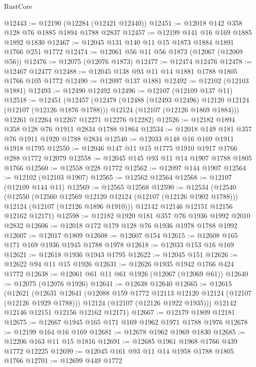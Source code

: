 \begin{lexlean}{RustCore}
\begin{coremodule}
@12443 := @12190 (@12284 (@12421 @12440))
@12451 := @12018 @142 @358 @128 @76 @1885 @1894 @1788 @2837
@12457 := @12199 @141 @16 @169 @1885 @1892 @1830
@12467 := @12045 @131 @140 @11 @15 @1873 @1884 @1891 @1766 @251 @1772
@12474 := @12061 @56 @11 @56 @1873 (@12067 (@12069 @56))
@12476 := @12075 (@12076 @1873)
@12477 := @12474 @12476
@12478 := @12467 @12477
@12488 := @12045 @138 @93 @11 @14 @1881 @1788 @1805 @1766 @105 @1772
@12490 := @12097 @137 @1881
@12492 := @12102 (@12103 @1881)
@12493 := @12490 @12492
@12496 := @12107 (@12109 @137 @11)
@12518 := @12451
    (@12457
      (@12478
        (@12488 (@12493 @12496) @12120 @12124 (@12107 (@12126 @1876 @1788)))
        @12124
        (@12107 (@12126 @1869 @1884)))
      @12261
      @12264
      @12267
      @12271
      @12276
      @12282)
@12526 := @12182 @1894 @358 @128 @76 @1911 @2834 @1788 @1864
@12534 := @12018 @149 @181 @357 @76 @1911 @1920 @1788 @2834
@12540 := @12033 @148 @16 @169 @1911 @1918 @1795
@12550 := @12046 @147 @11 @15 @1775 @1910 @1917 @1766 @288 @1772 @12079
@12558 := @12045 @145 @93 @11 @14 @1907 @1788 @1805 @1766
@12560 := @12558 @228 @1772
@12562 := @12097 @144 @1907
@12564 := @12102 (@12103 @1907)
@12565 := @12562 @12564
@12568 := @12107 (@12109 @144 @11)
@12569 := @12565 @12568
@12590 := @12534
    (@12540
      (@12550
        (@12560 @12569 @12120 @12124 (@12107 (@12126 @1902 @1788)))
        @12124
        (@12107 (@12126 @1896 @1910)))
      @12142
      @12146
      @12151
      @12156
      @12162
      @12171)
@12598 := @12182 @1920 @181 @357 @76 @1936 @1992 @2010 @2832
@12606 := @12018 @172 @179 @128 @76 @1936 @1978 @1788 @1992
@12607 := @12017 @1809
@12608 := @12607 @154
@12615 := @12608 @165 @171 @169 @1936 @1945 @1788 @1978
@12618 := @12033 @153 @16 @169
@12621 := @12618 @1936 @1943 @1795
@12622 := @12045 @151
@12626 := @12622 @94 @11 @15 @1926
@12631 := @12626 @1935 @1942 @1766 @424 @1772
@12638 := @12061 @61 @11 @61 @1926 (@12067 (@12069 @61))
@12640 := @12075 (@12076 @1926)
@12641 := @12638 @12640
@12665 := @12615
    (@12621
      (@12631
        @12641
        (@12088 @159 @1772 @12113 @12120 @12124 (@12107 (@12126 @1929 @1788)))
        @12124
        (@12107 (@12126 @1922 @1935)))
      @12142
      @12146
      @12151
      @12156
      @12162
      @12171)
@12667 := @12179 @1809 @12181
@12675 := @12667 @1945 @165 @171 @169 @1962 @1971 @1788 @1976
@12678 := @12199 @164 @16 @169
@12681 := @12678 @1962 @1969 @1830
@12685 := @12206 @163 @11 @15 @1816
@12691 := @12685 @1961 @1968 @1766 @439 @1772 @12225
@12699 := @12045 @161 @93 @11 @14 @1958 @1788 @1805 @1766
@12701 := @12699 @449 @1772

\end{coremodule}
\end{lexlean}
